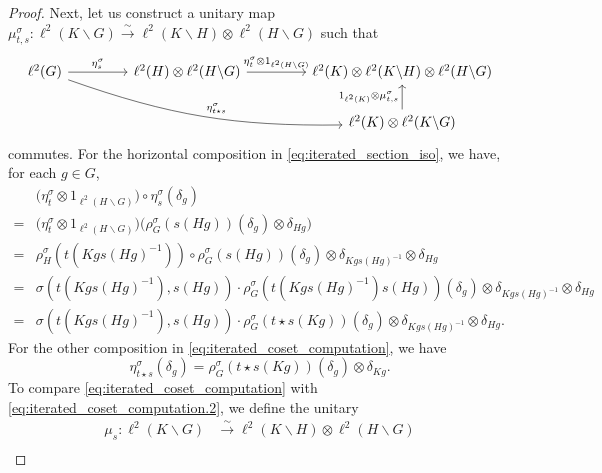 \documentclass{amsart}
\numberwithin{figure}{section}
\numberwithin{equation}{section}
\numberwithin{table}{section}
\theoremstyle{plain}
\theoremstyle{definition}
\theoremstyle{remark}
\theoremstyle{nonumber}
\begin{document}
\begin{proof}
Next, let us construct a unitary map $\mu_{t,s}^\sigma\colon
\ell^2(K\backslash G)\overset{\sim}{\to}\ell^2(K\backslash
H)\otimes\ell^2(H\backslash G)$ such that
\begin{equation}\label{eq:iterated_section_iso}
\begin{tikzcd}[column sep=1.5cm]
  \ell^2(G)\ar[r,"\eta_s^\sigma"]\ar[drr,"\eta_{t\star s}^\sigma", bend right=10] & \ell^2(H)\otimes \ell^2(H\backslash G) \ar[r,"\eta_t^\sigma\otimes 1_{\ell^2(H\backslash G)}"] & \ell^2(K)\otimes\ell^2(K\backslash H)\otimes\ell^2(H\backslash G)\\
  & &\ell^2(K)\otimes \ell^2(K\backslash G)\ar[u,"1_{\ell^2(K)}\otimes\mu_{t,s}^\sigma"]
\end{tikzcd}
\end{equation}
commutes. For the horizontal composition in
\eqref{eq:iterated_section_iso}, we have, for each $g\in G$,
\begin{equation}\label{eq:iterated_coset_computation}
\begin{aligned}
&\big(\eta_t^\sigma\otimes 1_{\ell^2(H\backslash G)}\big)\circ \eta_s^\sigma(\delta_g)\\
=&\big(\eta_t^\sigma\otimes 1_{\ell^2(H\backslash G)}\big)\big(\rho_G^\sigma(s(Hg))(\delta_g)\otimes\delta_{Hg}\big)\\
=&\rho_H^\sigma(t(Kgs(Hg)^{-1}))\circ\rho_G^\sigma(s(Hg))(\delta_g)\otimes \delta_{Kgs(Hg)^{-1}}\otimes\delta_{Hg}\\
=&\sigma(t(Kgs(Hg)^{-1}),s(Hg))\cdot\rho_G^\sigma(t(Kgs(Hg)^{-1})s(Hg))(\delta_g)\otimes \delta_{Kgs(Hg)^{-1}}\otimes\delta_{Hg}\\
=&\sigma(t(Kgs(Hg)^{-1}),s(Hg))\cdot\rho_G^\sigma(t\star s(Kg))(\delta_g)\otimes \delta_{Kgs(Hg)^{-1}}\otimes\delta_{Hg}.
\end{aligned}
\end{equation}
For the other composition in \eqref{eq:iterated_coset_computation}, we have
\begin{equation}\label{eq:iterated_coset_computation.2}
\eta_{t\star s}^\sigma(\delta_g)=\rho_G^\sigma(t\star s(Kg))(\delta_g)\otimes \delta_{Kg}.
\end{equation}
To compare \eqref{eq:iterated_coset_computation} with \eqref{eq:iterated_coset_computation.2}, we define the unitary
\begin{equation*}\label{eq:iterated_coset_space_bijection}
\begin{aligned}
\mu_s\colon \ell^2(K\backslash G)&\overset{\sim}{\to}\ell^2(K\backslash H)\otimes\ell^2(H\backslash G)\\

\end{aligned}
\end{equation*}
\end{proof}
\end{document}
